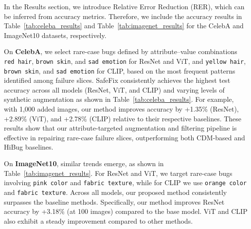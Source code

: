 \documentclass[10pt]{article} %
\newcommand{\model}{SafeFix\xspace}
\newcommand{\hibug}{HiBug\xspace}
\begin{document}
In the Results section, we introduce Relative Error Reduction (RER), which can be inferred from accuracy metrics. Therefore, we include the accuracy results in Table~\ref{tab:celeba_results} and Table~\ref{tab:imagenet_results} for the CelebA and ImageNet10 datasets, respectively.

On \textbf{CelebA}, we select rare-case bugs defined by attribute–value combinations \texttt{red hair}, \texttt{brown skin}, and \texttt{sad emotion} for ResNet and ViT, and \texttt{yellow hair}, \texttt{brown skin}, and \texttt{sad emotion} for CLIP, based on the most frequent patterns identified among failure slices. \model{} consistently achieves the highest test accuracy across all models (ResNet, ViT, and CLIP) and varying levels of synthetic augmentation as shown in Table~\ref{tab:celeba_results}. For example, with 1{,}000 added images, our method improves accuracy by +1.35\% (ResNet), +2.89\% (ViT), and +2.78\% (CLIP) relative to their respective baselines. These results show that our attribute-targeted augmentation and filtering pipeline is effective in repairing rare-case failure slices, outperforming both CDM-based and \hibug{} baselines.


On \textbf{ImageNet10}, similar trends emerge, as shown in Table~\ref{tab:imagenet_results}. For ResNet and ViT, we target rare-case bugs involving \texttt{pink color} and \texttt{fabric texture}, while for CLIP we use \texttt{orange color} and \texttt{fabric texture}. Across all models, our proposed method consistently surpasses the baseline methods. Specifically, our method improves ResNet accuracy by +3.18\% (at 100 images) compared to the base model. ViT and CLIP also exhibit a steady improvement compared to other methods.
\end{document}
